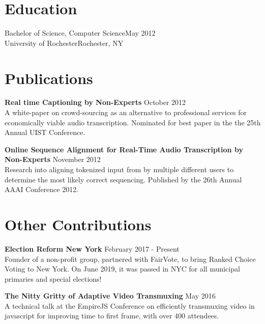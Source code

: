 \section{Education}

  Bachelor of Science, Computer Science\hfill May 2012\\
  University of Rochester\hfill Rochester, NY\\

\section{Publications}
  \begin{flushleft}

    \textbf{Real time Captioning by Non-Experts} \hfill October  2012\\
    A white-paper on crowd-sourcing as an alternative to professional services for economically viable audio transcription. Nominated for best paper in the the 25th Annual UIST Conference.
    \vspace{10pt}    
    
    
    \textbf{Online Sequence Alignment for Real-Time Audio Transcription by Non-Experts} \hfill November 2012\\
    Research into aligning tokenized input from by multiple different users to determine the most likely correct sequencing. Published by the 26th Annual AAAI Conference 2012.
  \end{flushleft}


\section{Other Contributions}
  \begin{flushleft}

    \textbf{Election Reform New York} \hfill February  2017 - Present\\
    Founder of a non-profit group, partnered with FairVote, to bring Ranked Choice Voting to New York.
    On June 2019, it was passed in NYC for all municipal primaries and special elections!
    \vspace{10pt}    

        
    \textbf{The Nitty Gritty of Adaptive Video Transmuxing} \hfill May  2016\\
    A technical talk at the EmpireJS Conference on efficiently transmuxing video in javascript for improving time to first frame, with over 400 attendees.
  \end{flushleft}

